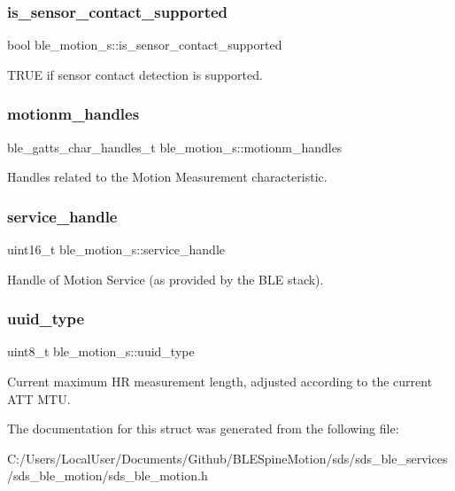 \subsubsection{\texorpdfstring{is\_sensor\_contact\_supported}{is\_sensor\_contact\_supported}}
{\footnotesize\ttfamily bool ble\+\_\+motion\+\_\+s\+::is\+\_\+sensor\+\_\+contact\+\_\+supported}

T\+R\+UE if sensor contact detection is supported. \mbox{\label{structble__motion__s_a1da99e886537aca874d9d5e583126c0e}} 
\subsubsection{\texorpdfstring{motionm\_handles}{motionm\_handles}}
{\footnotesize\ttfamily ble\+\_\+gatts\+\_\+char\+\_\+handles\+\_\+t ble\+\_\+motion\+\_\+s\+::motionm\+\_\+handles}

Handles related to the Motion Measurement characteristic. \mbox{\label{structble__motion__s_afbe22f59669b316e1a5d8d89e4837643}} 
\subsubsection{\texorpdfstring{service\_handle}{service\_handle}}
{\footnotesize\ttfamily uint16\+\_\+t ble\+\_\+motion\+\_\+s\+::service\+\_\+handle}

Handle of Motion Service (as provided by the B\+LE stack). \mbox{\label{structble__motion__s_a8ae45e03dea1630dee7f9c4e1fa12a45}} 
\subsubsection{\texorpdfstring{uuid\_type}{uuid\_type}}
{\footnotesize\ttfamily uint8\+\_\+t ble\+\_\+motion\+\_\+s\+::uuid\+\_\+type}

Current maximum HR measurement length, adjusted according to the current A\+TT M\+TU. 

The documentation for this struct was generated from the following file\+:\begin{DoxyCompactItemize}
\item 
C\+:/\+Users/\+Local\+User/\+Documents/\+Github/\+B\+L\+E\+Spine\+Motion/sds/sds\+\_\+ble\+\_\+services/sds\+\_\+ble\+\_\+motion/sds\+\_\+ble\+\_\+motion.\+h\end{DoxyCompactItemize}
